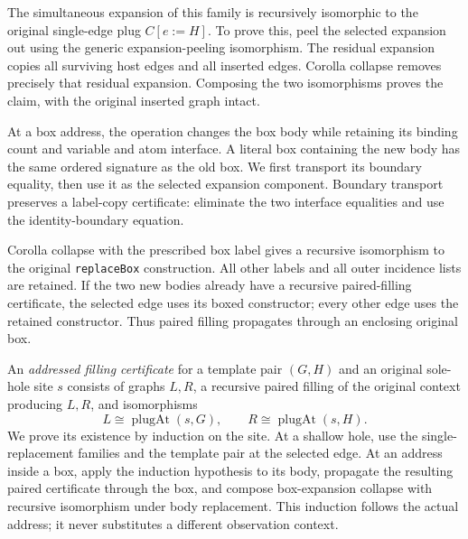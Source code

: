 
The simultaneous expansion of this family is recursively isomorphic to the
original single-edge plug $C[e:=H]$. To prove this, peel the selected expansion
out using the generic expansion-peeling isomorphism. The residual expansion
copies all surviving host edges and all inserted edges. Corolla collapse
removes precisely that residual expansion. Composing the two isomorphisms
proves the claim, with the original inserted graph intact.


At a box address, the operation changes the box body while retaining its
binding count and variable and atom interface. A literal box containing the
new body has the same ordered signature as the old box. We first transport
its boundary equality, then use it as the selected expansion component.
Boundary transport preserves a label-copy certificate: eliminate the two
interface equalities and use the identity-boundary equation.


Corolla collapse with the prescribed box label gives a recursive isomorphism
to the original \texttt{replaceBox} construction.
All other labels and all outer incidence lists are retained. If the two new
bodies already have a recursive paired-filling certificate, the selected edge
uses its boxed constructor; every other edge uses the retained constructor.
Thus paired filling propagates through an enclosing original box.


An \emph{addressed filling certificate} for a template pair $(G,H)$ and an
original sole-hole site $s$ consists of graphs $L,R$, a recursive paired
filling of the original context producing $L,R$, and isomorphisms
\[
 L\cong \operatorname{plugAt}(s,G),\qquad
 R\cong \operatorname{plugAt}(s,H).
\]
We prove its existence by induction on the site. At a shallow hole, use the
single-replacement families and the template pair at the selected edge.
At an address inside a box, apply the induction hypothesis to its body,
propagate the resulting paired certificate through the box, and compose
box-expansion collapse with recursive isomorphism under body replacement.
This induction follows the actual address; it never substitutes a different
observation context.

